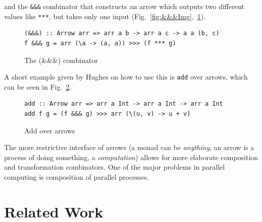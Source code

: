 \documentclass{jfp1}
\newcommand{\inlinecode}[1]{\texttt{#1}}
\begin{document}
and the \inlinecode{\&\&\&} combinator that constructs an arrow which outputs two different values like \inlinecode{***}, but takes only one input (Fig.~\ref{fig:&&&Img},~\ref{fig:&&&}).
\begin{figure}[h]
\begin{lstlisting}[frame=htrbl]
(&&&) :: Arrow arr => arr a b -> arr a c -> a a (b, c)
f &&& g = arr (\a -> (a, a)) >>> (f *** g)
\end{lstlisting}
\caption{The (\&\&\&) combinator}
\label{fig:&&&}
\end{figure}
A short example given by Hughes on how to use this is \lstinline{add} over arrows, which can be seen in Fig.~\ref{fig:addArrows}.
\begin{figure}[h]
\begin{lstlisting}[frame=htrbl]
add :: Arrow arr => arr a Int -> arr a Int -> arr a Int
add f g = (f &&& g) >>> arr (\(u, v) -> u + v)
\end{lstlisting}
\caption{Add over arrows}
\label{fig:addArrows}
\end{figure}
%

The more restrictive interface of arrows (a monad can be \emph{anything}, an arrow is a process of doing something, a \emph{computation}) allows for more elaborate composition and transformation combinators. One of the major problems in parallel computing is composition of parallel processes.


	\section{Related Work}
\label{sec:related-work}
\end{document}
